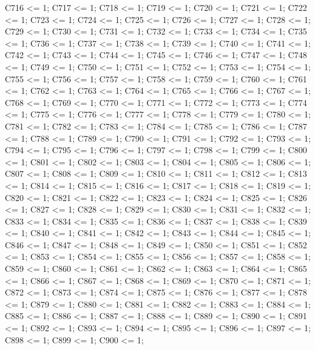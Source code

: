 C716 <= 1;
C717 <= 1;
C718 <= 1;
C719 <= 1;
C720 <= 1;
C721 <= 1;
C722 <= 1;
C723 <= 1;
C724 <= 1;
C725 <= 1;
C726 <= 1;
C727 <= 1;
C728 <= 1;
C729 <= 1;
C730 <= 1;
C731 <= 1;
C732 <= 1;
C733 <= 1;
C734 <= 1;
C735 <= 1;
C736 <= 1;
C737 <= 1;
C738 <= 1;
C739 <= 1;
C740 <= 1;
C741 <= 1;
C742 <= 1;
C743 <= 1;
C744 <= 1;
C745 <= 1;
C746 <= 1;
C747 <= 1;
C748 <= 1;
C749 <= 1;
C750 <= 1;
C751 <= 1;
C752 <= 1;
C753 <= 1;
C754 <= 1;
C755 <= 1;
C756 <= 1;
C757 <= 1;
C758 <= 1;
C759 <= 1;
C760 <= 1;
C761 <= 1;
C762 <= 1;
C763 <= 1;
C764 <= 1;
C765 <= 1;
C766 <= 1;
C767 <= 1;
C768 <= 1;
C769 <= 1;
C770 <= 1;
C771 <= 1;
C772 <= 1;
C773 <= 1;
C774 <= 1;
C775 <= 1;
C776 <= 1;
C777 <= 1;
C778 <= 1;
C779 <= 1;
C780 <= 1;
C781 <= 1;
C782 <= 1;
C783 <= 1;
C784 <= 1;
C785 <= 1;
C786 <= 1;
C787 <= 1;
C788 <= 1;
C789 <= 1;
C790 <= 1;
C791 <= 1;
C792 <= 1;
C793 <= 1;
C794 <= 1;
C795 <= 1;
C796 <= 1;
C797 <= 1;
C798 <= 1;
C799 <= 1;
C800 <= 1;
C801 <= 1;
C802 <= 1;
C803 <= 1;
C804 <= 1;
C805 <= 1;
C806 <= 1;
C807 <= 1;
C808 <= 1;
C809 <= 1;
C810 <= 1;
C811 <= 1;
C812 <= 1;
C813 <= 1;
C814 <= 1;
C815 <= 1;
C816 <= 1;
C817 <= 1;
C818 <= 1;
C819 <= 1;
C820 <= 1;
C821 <= 1;
C822 <= 1;
C823 <= 1;
C824 <= 1;
C825 <= 1;
C826 <= 1;
C827 <= 1;
C828 <= 1;
C829 <= 1;
C830 <= 1;
C831 <= 1;
C832 <= 1;
C833 <= 1;
C834 <= 1;
C835 <= 1;
C836 <= 1;
C837 <= 1;
C838 <= 1;
C839 <= 1;
C840 <= 1;
C841 <= 1;
C842 <= 1;
C843 <= 1;
C844 <= 1;
C845 <= 1;
C846 <= 1;
C847 <= 1;
C848 <= 1;
C849 <= 1;
C850 <= 1;
C851 <= 1;
C852 <= 1;
C853 <= 1;
C854 <= 1;
C855 <= 1;
C856 <= 1;
C857 <= 1;
C858 <= 1;
C859 <= 1;
C860 <= 1;
C861 <= 1;
C862 <= 1;
C863 <= 1;
C864 <= 1;
C865 <= 1;
C866 <= 1;
C867 <= 1;
C868 <= 1;
C869 <= 1;
C870 <= 1;
C871 <= 1;
C872 <= 1;
C873 <= 1;
C874 <= 1;
C875 <= 1;
C876 <= 1;
C877 <= 1;
C878 <= 1;
C879 <= 1;
C880 <= 1;
C881 <= 1;
C882 <= 1;
C883 <= 1;
C884 <= 1;
C885 <= 1;
C886 <= 1;
C887 <= 1;
C888 <= 1;
C889 <= 1;
C890 <= 1;
C891 <= 1;
C892 <= 1;
C893 <= 1;
C894 <= 1;
C895 <= 1;
C896 <= 1;
C897 <= 1;
C898 <= 1;
C899 <= 1;
C900 <= 1; \\

